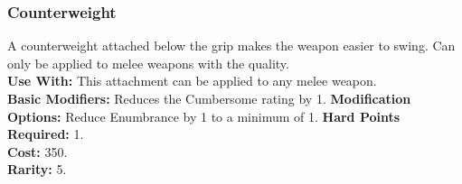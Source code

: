 \subsubsection{Counterweight}
A counterweight attached below the grip makes the
weapon easier to swing. Can only be applied to melee
weapons with the  quality.\\
\textbf{Use With:} This attachment can be applied to any
    melee weapon.\\
\textbf{Basic Modifiers:} Reduces the Cumbersome rating by 1.
\textbf{Modification Options:} Reduce Enumbrance by 1 to a
minimum of 1.
\textbf{Hard Points Required:} 1.\\
\textbf{Cost:} 350.\\
\textbf{Rarity:} 5.\\
